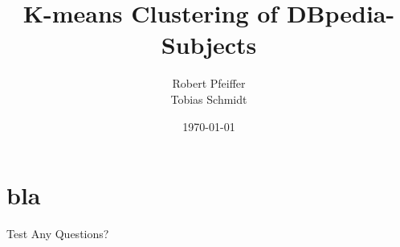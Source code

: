 \documentclass[xelatex]{beamer}
\title{K-means Clustering of DBpedia-Subjects}
\author[Robert Pfeiffer and Tobias Schmidt] {Robert Pfeiffer\\Tobias Schmidt}
\date{\today}
\begin{document}
\maketitle
\tableofcontents

\section{bla}

\begin{frame}{Test}
  Any Questions?
  \pause
\end{frame}
\end{document}
